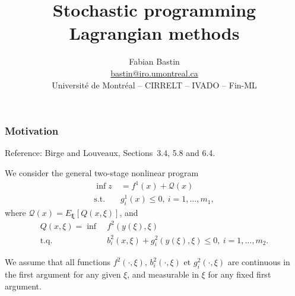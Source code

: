 \documentclass[french]{beamer}
\title[Stochastic Lagrangian]{Stochastic programming\\Lagrangian methods}
\author[Fabian Bastin]{Fabian Bastin \\ \url{bastin@iro.umontreal.ca} \\ Université de Montréal -- CIRRELT -- IVADO -- Fin-ML}
\date{}
\def\bxi{\boldsymbol\xi}
\begin{document}
\frame{\titlepage}

\begin{frame}
\frametitle{Motivation}

{\red Reference}: Birge and Louveaux, Sections~3.4, 5.8 and 6.4.

\mbox{}

We consider the general {\blue two-stage nonlinear program}
\begin{align*}
\inf z\ &= f^1(x) + \mathcal{Q}(x) \\
\mbox{s.t. } & g_i^1(x) \leq 0,\ i = 1,\ldots,m_1,
\end{align*}
where $\mathcal{Q}(x) = E_{\bxi}[Q(x,\xi)]$, and
\begin{align*}
Q(x,\xi) = \inf\ & f^2(y(\xi),\xi) \\
\mbox{t.q. } & b_i^2(x,\xi) + g_i^2(y(\xi), \xi) \leq 0,\ i = 1,\ldots,m_2.
\end{align*}

We assume that all functions $f^2(\cdot,\xi)$, $b_i^2(\cdot,\xi)$ et $g_i^2(\cdot,\xi)$ are continuous in the first argument for any given $\xi$, and measurable in $\xi$ for any fixed first argument.

\end{frame}



\end{document}
